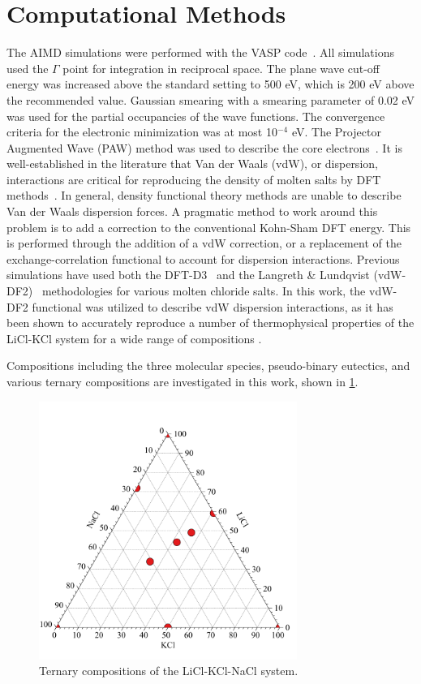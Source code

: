 \documentclass[review]{elsarticle}
\begin{document}
\section{Computational Methods}\label{sec:method}
The AIMD simulations were performed with the VASP code~\cite{Kresse1996}. All simulations used the $\Gamma$ point for integration in reciprocal space. The plane wave cut-off energy was increased above the standard setting to 500 eV, which is 200 eV above the recommended value. Gaussian smearing with a smearing parameter of 0.02 eV was used for the partial occupancies of the wave functions. The convergence criteria for the electronic minimization was at most 10$^{-4}$ eV. The Projector Augmented Wave (PAW) method was used to describe the core electrons~\cite{PAW1,PAW2}. It is well-established in the literature that Van der Waals (vdW), or dispersion, interactions are critical for reproducing the density of molten salts by DFT methods~\cite{Li,Nam2014,Nam2015}. In general, density functional theory methods are unable to describe Van der Waals dispersion forces. A pragmatic method to work around this problem is to add a correction to the conventional Kohn-Sham DFT energy. This is performed through the addition of a vdW correction, or a replacement of the exchange-correlation functional to account for dispersion interactions. Previous simulations have used both the DFT-D3~\cite{Li,Grimme} and the Langreth \& Lundqvist (vdW-DF2)~\cite{Nam2015,Dion,Klimes} methodologies for various molten chloride salts. In this work, the vdW-DF2 functional was utilized to describe vdW dispersion interactions, as it has been shown to accurately reproduce a number of thermophysical properties of the LiCl-KCl system for a wide range of compositions \cite{Duemmler2021}. 

Compositions including the three molecular species, pseudo-binary eutectics, and various ternary compositions are investigated in this work, shown in \cref{fig:ternary}.

\begin{figure}[htbp]
\begin{center}
\includegraphics[width=0.75\textwidth]{./images/ternary.pdf}
\caption{Ternary compositions of the LiCl-KCl-NaCl system.}
\label{fig:ternary}
\end{center}
\end{figure}
\end{document}
